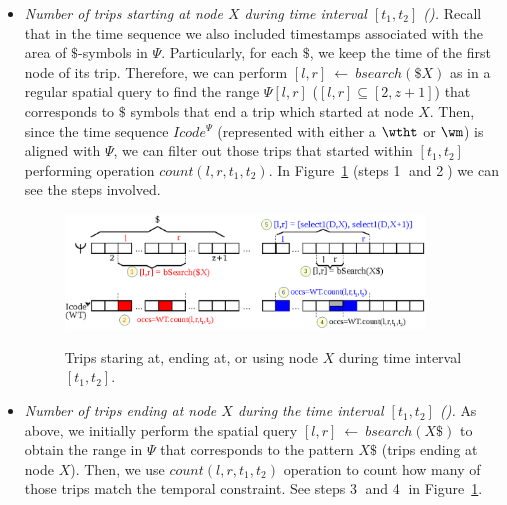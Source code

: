 \begin{itemize}[leftmargin=3mm]

	\setlength{\itemindent}{0mm}
	\item {\em Number of trips starting at node $X$ during time interval $[t_1,t_2]$ (\Tswx).}
	Recall that in the time sequence we also included timestamps associated with the area of $\$$-symbols in $\Psi$.
	Particularly, for each $\$$, we keep the time of the first node of its trip. Therefore, 
	we can perform $[l,r]~\leftarrow~bsearch(\$X)$ as in a regular spatial query to find the
	range $\Psi[l,r]$ ($[l,r]\subseteq [2,z+1]$) that corresponds to $\$$ symbols that end a trip
	which started at node $X$. Then, since the time sequence $Icode^{\Psi}$ 
	(represented with either a $\wtht$ or $\wm$) is
	 aligned with $\Psi$, we can filter out those trips that started within $[t_1,t_2]$ performing
	operation $count(l,r,t_1,t_2)$. In Figure~\ref{fig:search2} (steps \textcircled{1} and \textcircled{2}) we can see the steps involved.

\begin{figure}[thb]
	\begin{center}
		{\includegraphics[width=0.90\textwidth]{figures/search2.eps}}
	\end{center}
	\vspace{-0.3cm}
	\caption{Trips staring at, ending at, or using node $X$  during time interval $[t_1,t_2]$.}
	\label{fig:search2}
\end{figure}
	
	\item {\em Number of trips ending at node $X$ during the time interval $[t_1,t_2]$ (\Tewx). }
	As above, we initially perform the spatial query $[l,r]~\leftarrow~bsearch(X\$)$ to 
	obtain the range in $\Psi$ that corresponds to the pattern $X\$$ (trips ending at node $X$).
	Then, we use  $count(l,r,t_1,t_2)$ operation to count how many of those trips match the temporal constraint.
	See steps \textcircled{3} and \textcircled{4} in Figure~\ref{fig:search2}.
	

\end{itemize}
